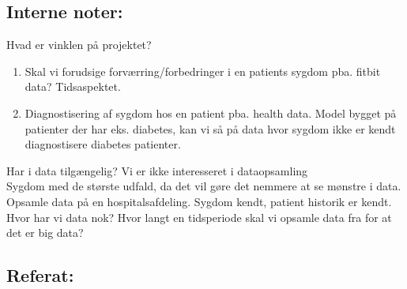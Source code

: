 \subsection*{Interne noter:}
Hvad er vinklen på projektet?
\begin{enumerate}
    \item Skal vi forudsige forværring/forbedringer i en patients sygdom pba. fitbit data? Tidsaspektet.
    \item Diagnostisering af sygdom hos en patient pba. health data. Model bygget på patienter der har eks. diabetes, kan vi så på data hvor sygdom ikke er kendt diagnostisere diabetes patienter.
\end{enumerate}
Har i data tilgængelig? Vi er ikke interesseret i dataopsamling \\
Sygdom med de største udfald, da det vil gøre det nemmere at se mønstre i data. \\
Opsamle data på en hospitalsafdeling. Sygdom kendt, patient historik er kendt. \\
Hvor har vi data nok? Hvor langt en tidsperiode skal vi opsamle data fra for at det er big data?\\

\subsection*{Referat:}

